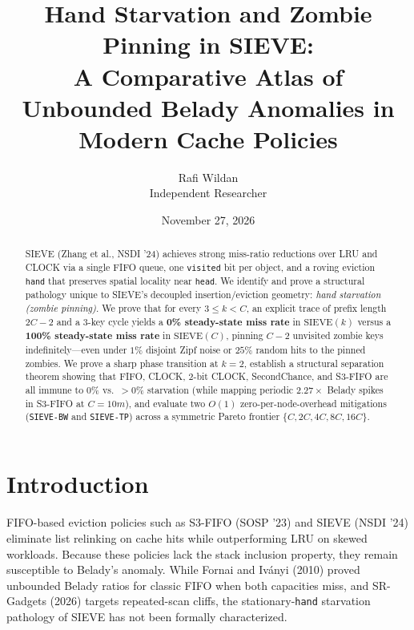 \documentclass[10pt,twocolumn]{article}
\title{\textbf{Hand Starvation and Zombie Pinning in SIEVE:\\A Comparative Atlas of Unbounded Belady Anomalies in Modern Cache Policies}}
\author{Rafi Wildan\\Independent Researcher}
\date{November 27, 2026}
\begin{document}
\maketitle

\begin{abstract}
SIEVE (Zhang et al., NSDI '24) achieves strong miss-ratio reductions over LRU and CLOCK via a single FIFO queue, one \texttt{visited} bit per object, and a roving eviction \texttt{hand} that preserves spatial locality near \texttt{head}. We identify and prove a structural pathology unique to SIEVE's decoupled insertion/eviction geometry: \emph{hand starvation (zombie pinning)}. We prove that for every $3 \le k < C$, an explicit trace of prefix length $2C-2$ and a 3-key cycle yields a \textbf{0\% steady-state miss rate} in $\mathrm{SIEVE}(k)$ versus a \textbf{100\% steady-state miss rate} in $\mathrm{SIEVE}(C)$, pinning $C-2$ unvisited zombie keys indefinitely—even under $1\%$ disjoint Zipf noise or $25\%$ random hits to the pinned zombies. We prove a sharp phase transition at $k=2$, establish a structural separation theorem showing that FIFO, CLOCK, 2-bit CLOCK, SecondChance, and S3-FIFO are all immune to $0\%$ vs.\ $>0\%$ starvation (while mapping periodic $2.27\times$ Belady spikes in S3-FIFO at $C=10m$), and evaluate two $O(1)$ zero-per-node-overhead mitigations (\texttt{SIEVE-BW} and \texttt{SIEVE-TP}) across a symmetric Pareto frontier $\{C, 2C, 4C, 8C, 16C\}$.
\end{abstract}

\section{Introduction}
FIFO-based eviction policies such as S3-FIFO (SOSP '23) and SIEVE (NSDI '24) eliminate list relinking on cache hits while outperforming LRU on skewed workloads. Because these policies lack the stack inclusion property, they remain susceptible to Belady's anomaly. While Fornai and Iv\'anyi (2010) proved unbounded Belady ratios for classic FIFO when both capacities miss, and SR-Gadgets (2026) targets repeated-scan cliffs, the stationary-\texttt{hand} starvation pathology of SIEVE has not been formally characterized.
\end{document}
